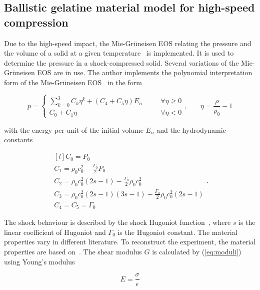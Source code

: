 \documentclass{svproc}
\newcommand{\reva}[1]{{\color{black}#1}}
\newcommand{\revb}[1]{{\color{black}#1}}
\begin{document}
\subsection{Ballistic gelatine material model for high-speed compression}
%
Due to the high-speed impact, the Mie-Gr\"uneisen EOS relating the pressure and the volume of a solid at a given temperature~\cite{Robinson:2019} is implemented. It is used to determine the pressure in a shock-compressed solid. Several variations of the Mie-Grüneisen EOS are in use. The author implements the polynomial interpretation form of the Mie-Grüneisen EOS~\cite{Taddei:2015} in the form

\begin{equation}
\label{eq:EOS}
p=\left\{\begin{matrix}
\sum\limits_{k=0}^3 C_k\eta^k+\left(C_4+C_5\eta\right)E_n & \quad & \forall\eta\ge 0\\
C_0+C_1\eta & \quad & \forall\eta<0
\end{matrix}\right.
\mbox{,}\qquad
\eta=\frac{\rho}{\rho_0}-1
\end{equation}

\noindent
with the energy per unit of the initial volume $E_n$ and the hydrodynamic constants

\begin{equation}
\begin{matrix*}[l]
C_0=P_0 \\
C_1=\rho_0 c_0^2-\frac{\Gamma_0}{2}P_0 \\
C_2=\rho_0 c_0^2(2s-1)-\frac{\Gamma_0}{2}\rho_0 c_0^2 \\
C_3=\rho_0 c_0^2(2s-1)(3s-1)-\frac{\Gamma_0}{2}\rho_0 c_0^2(2s-1) \\
C_4=C_5=\Gamma_0
\end{matrix*}
\mbox{.}
\end{equation}

\reva{The shock behaviour is described by the shock Hugoniot function~\cite{Awoukeng:2014}, where $s$ is the linear coefficient of Hugoniot and $\Gamma_0$ is the Hugoniot constant.} The material properties vary in different \revb{literature}. To reconstruct the experiment, the material properties are based on~\cite{Casem:2014}. The shear modulus $G$ is calculated by (\ref{eq:moduli}) using Young's modulus

\begin{equation}
E=\frac{\sigma}{\epsilon}
\end{equation}
\end{document}
